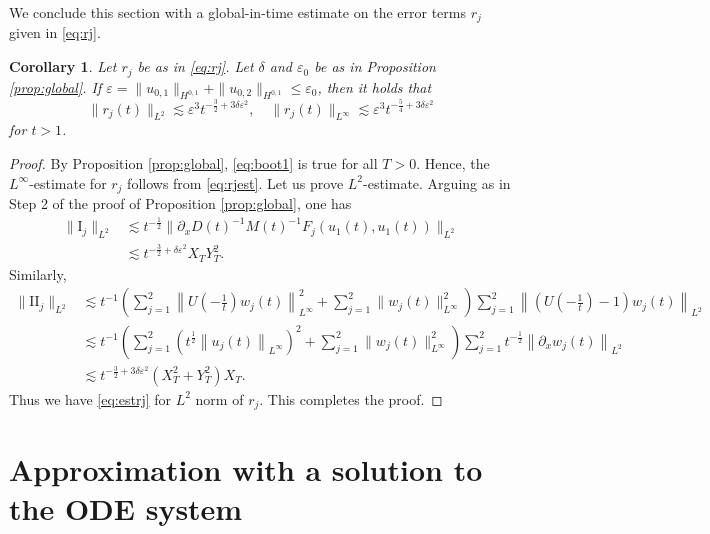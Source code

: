 \documentclass[11pt,a4paper,twosides]{amsart}
\theoremstyle{plain}
\newtheorem{corollary}[theorem]{Corollary}
\theoremstyle{remark}
\numberwithin{equation}{section}
\def\le{\leqslant}
\theoremstyle{definition}
\newcommand{\1}{{\bf 1}_{\{|x| < |t|\}}}
\renewcommand{\epsilon}{\varepsilon}
\begin{document}
We conclude this section with a global-in-time estimate on the error terms $r_j$ given in \eqref{eq:rj}.
\begin{corollary}\label{cor:rj}
  Let $r_j$ 
  be as in \eqref{eq:rj}.
  Let $\delta$ and $\epsilon_0$ be as in Proposition \ref{prop:global}.
  If $\epsilon= \|u_{0,1}\|_{H^{0,1}} + \|u_{0,2}\|_{H^{0,1}}
\le\epsilon_0$, then it holds that
  \begin{equation}\label{eq:estrj}
    \|r_j(t)\|_{L^2} \lesssim \epsilon^3t^{-\frac{3}{2}+3\delta\epsilon^2}, \quad
    \|r_j(t)\|_{L^\infty} \lesssim \epsilon^3t^{-\frac54+3\delta\epsilon^2}
  \end{equation}
  for $t > 1$.
\end{corollary}

\begin{proof}
By Proposition \ref{prop:global},
\eqref{eq:boot1} is true for all $T>0$.
Hence, the $L^\infty$-estimate for $r_j$ 
follows from \eqref{eq:rjest}.
Let us prove $L^2$-estimate.
Arguing as in Step 2 of the proof of Proposition \ref{prop:global},
one has
  \begin{align*}
    \|\textrm{I}_j\|_{L^2} & \lesssim t^{-\frac12}
\|\partial_xD(t)^{-1}M(t)^{-1}F_j(u_1(t), u_1(t))\|_{L^2}   \\
                                  & \lesssim t^{-\frac32+\delta\epsilon^2}X_TY_T^2.
  \end{align*}
Similarly,
  \begin{align*}
    \|\textrm{II}_j\|_{L^2} & \lesssim t^{-1}
    \left(\sum_{j=1}^2\left\|U(-\tfrac{1}{t})w_j(t)\right\|_{L^\infty}^2 + \sum_{j=1}^2\|w_j(t)\|_{L^\infty}^2\right)
    \sum_{j=1}^2\left\|(U(-\tfrac{1}{t})-1)w_j(t)\right\|_{L^2}                          \\
                                 & \lesssim t^{-1}
    \left(\sum_{j=1}^2(t^{\frac12}\left\|u_j(t)\right\|_{L^\infty})^2 + 
    \sum_{j=1}^2\|w_j(t)\|_{L^\infty}^2\right)
    \sum_{j=1}^2t^{-\frac12}\left\|\partial_x w_j(t)\right\|_{L^2}                            \\
                                 & \lesssim t^{-\frac32+3\delta\epsilon^2}(X_T^2 + Y_T^2)X_T.
\end{align*}
Thus we have \eqref{eq:estrj} for $L^2$ norm of $r_j$. 
This completes the proof.
\end{proof}

\section{Approximation with a solution to the ODE system}
\end{document}
